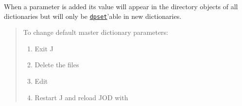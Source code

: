 When a parameter is added its value will appear in the directory
objects of all dictionaries but will only be \hyperlink{il:dpset}{\texttt{dpset}}'able in new dictionaries.

\begin{quotation}
	To change default master dictionary parameters:
	\begin{enumerate}
	  \item Exit J
		\item Delete the files
		\item Edit 
		\item Restart J and reload JOD with 
	 \end{enumerate}
\end{quotation}


